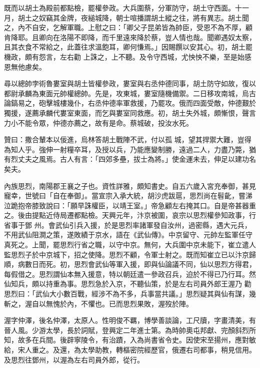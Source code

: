 \begin{pinyinscope}
 既而以胡土為殿前都點檢，罷權參政。大兵圍蔡，分軍防守，胡土守西面。十一月，胡土之奴竊其金牌，夜縋城降，朝士喧播謂胡土縱之往，將有異志。胡土聞之，內不自安，乞解軍職。上慰之曰：「卿父子昆弟皆為帥臣，受恩不為不厚，顧肯降耶。且卿向在洛陽不即降，而千里遠來降於蔡，豈人情也哉。聞卿遇奴太察，且其衣食不常給之，此蓋往求溫飽耳，卿何慊焉。」因賜饌以安其心。初，胡土罷機政，頗有怨言，左右勸
 上誅之，上不聽。及令守西城，尤怏怏不樂，至是始感恩無他慮矣。



 尋以總帥孛術魯婁室與胡土皆權參政，婁室與右丞仲德同事，胡土防守如故，復以都尉承麟為東面元帥權總帥。先是，攻東城，婁室隨機備禦。二日移攻南城，烏古論鎬易之，砲擊城樓幾仆，右丞仲德率軍救援，乃罷攻。俄而四面受敵，仲德艱於獨援，遂薦承麟代婁室東面，而乞與婁室同救應。初，胡土失外城，頗慚恨，聲言力小不能令眾，仲德亦薦之，故有是命。蔡城破，投汝水死。



 贊曰：撒合輦本以佞進，烏林答胡土戰陣不武，付以孤
 城，望其捍禦大難，豈得為知人乎。強伸一射糧卒耳，及授以兵，乃能應變制勝，遠過二人，力盡乃斃，猶有烈丈夫之風焉。古人有言：「四郊多壘，拔士為將。」使金運未去，伸足以建功名矣夫。



 內族思烈，南陽郡王襄之子也。資性詳雅，頗知書史。自五六歲入宮充奉御，甚見寵幸，世號曰「自在奉御」。當宣宗入承大統，胡沙虎跋扈，思烈尚在髫齔，嘗涕泣跪抱帝膝致說曰：「願早誅權臣，以靖王室。」帝急顧左右掩其口。自是帝甚器重之。後由提點近侍局遷都點檢。天興元年，汴京被圍，哀宗以思烈權參知政事，行省事于鄧
 州。會武仙引兵入援，於是思烈率諸軍發自汝州，過密縣，遇大元兵，不用武仙阻澗之策，遂敗績于京水，語在《武仙傳》。中京留守、元帥左監軍任守真死之。上聞，罷思烈行省之職，以守中京。無何，大兵圍中京未能下，崔立遣人監思烈子於中京城下，招之使降。思烈不顧，令軍士射之。既而知崔立已以汴京歸順，病數日而死。初，思烈會武仙等軍入援，即與仙論議不同，仙以思烈方得君，每假借之。思烈謂仙本無入援意，特以朝廷遣一參政召兵，迫於不得已乃行耳。然仙知兵，頗以持重為事。思烈急於入京，不聽仙策，於是左右司員外郎王渥乃
 勸思烈曰：「武仙大小數百戰，經涉不為不多，兵事當共議。」思烈疑其與仙有謀，幾斬之，渥自以無愧於內，不懼也。已而思烈果敗，渥歿於陣。



 渥字仲澤，後名仲澤，太原人。性明俊不羈，博學善談論，工尺牘，字畫清美，有晉人風。少游太學，長於詞賦，登興定二年進士第。為時帥奧屯邦獻、完顏斜烈所知，故多在兵間。後辟寧陵令，有治蹟，入為尚書省令史。因使宋至揚州，應對敏給，宋人重之。及還，為太學助教，轉樞密院經歷官，俄遷右司都事，稍見信用。及思烈往鄧州，以渥為左右司員外郎，從行。




\end{pinyinscope}
